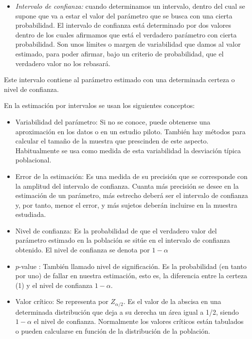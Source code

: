 \begin{itemize}
    \begin{itemize}
        \item \textit{Puntual:} cuando buscamos un valor concreto. Un estimador de un par\'ametro poblacional es una funci\'on de los datos muestrales. En pocas palabras, es una f\'ormula que depende de los valores obtenidos de una muestra, para realizar estimaciones. Lo que se pretende obtener es el valor exacto de un par\'ametro.
    \end{itemize}
    \item \textit{Intervalo de confianza:} cuando determinamos un intervalo, dentro del cual se supone que va a estar el valor del par\'ametro que se busca con una cierta probabilidad. El intervalo de confianza est\'a determinado por dos valores dentro de los cuales afirmamos que est\'a el verdadero par\'ametro con cierta probabilidad. Son unos l\'imites o margen de variabilidad que damos al valor estimado, para poder afirmar, bajo un criterio de probabilidad, que el verdadero valor no los rebasar\'a.
\end{itemize}

Este intervalo contiene al par\'ametro estimado con una determinada certeza o nivel de confianza. 

En la estimaci\'on por intervalos se usan los siguientes conceptos:

\begin{itemize}
    \item Variabilidad del par\'ametro: Si no se conoce, puede obtenerse una aproximaci\'on en los datos o en un estudio piloto. Tambi\'en hay m\'etodos para calcular el tama\~no de la muestra que prescinden de este aspecto. Habitualmente se usa como medida de esta variabilidad la desviaci\'on t\'ipica poblacional.
    \item Error de la estimaci\'on: Es una medida de su precisi\'on que se corresponde con la amplitud del intervalo de confianza. Cuanta m\'as precisi\'on se desee en la estimaci\'on de un par\'ametro, m\'as estrecho deber\'a ser el intervalo de confianza y, por tanto, menor el error, y m\'as sujetos deber\'an incluirse en la muestra estudiada. 
    \item Nivel de confianza: Es la probabilidad de que el verdadero valor del par\'ametro estimado en la poblaci\'on se sit\'ue en el intervalo de confianza obtenido. El nivel de confianza se denota por $1-\alpha$
    \item $p$-value : Tambi\'en llamado nivel de significaci\'on. Es la probabilidad (en tanto por uno) de fallar en nuestra estimaci\'on, esto es, la diferencia entre la certeza (1) y el nivel de confianza $1-\alpha$. 
    \item Valor cr\'itico: Se representa por $Z_{\alpha/2}$. Es el valor de la abscisa en una determinada distribuci\'on que deja a su derecha un \'area igual a 1/2, siendo $1-\alpha$ el nivel de confianza. Normalmente los valores cr\'iticos est\'an tabulados o pueden calcularse en funci\'on de la distribuci\'on de la poblaci\'on.
\end{itemize}

